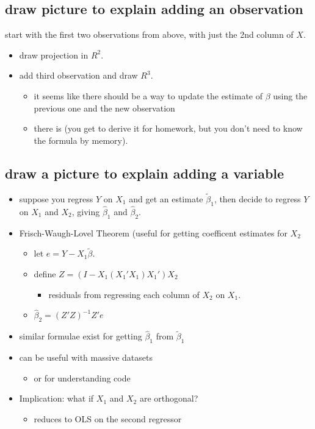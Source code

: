 \subsection{draw picture to explain adding an observation}
\label{sec-2-2}

     start with the first two observations from above, with just the 2nd
     column of $X$.
\begin{itemize}
\item draw projection in $R^2$.
\item add third observation and draw $R^3$.
\begin{itemize}
\item it seems like there should be a way to update the estimate of
         $\beta$ using the previous one and the new observation
\item there is (you get to derive it for homework, but you don't need
         to know the formula by memory).
\end{itemize}
\end{itemize}
\subsection{draw a picture to explain adding a variable}
\label{sec-2-3}

\begin{itemize}
\item suppose you regress $Y$ on $X_1$ and get an estimate
      $\tilde\beta_1$, then decide to regress $Y$ on $X_1$ and $X_2$,
      giving $\hat\beta_1$ and $\hat\beta_2$.
\item Frisch-Waugh-Lovel Theorem (useful for getting coefficent
      estimates for $X_2$
\begin{itemize}
\item let $e = Y - X_1\tilde \beta$.
\item define $Z = (I - X_1(X_1'X_1)X_1')X_2$
\begin{itemize}
\item residuals from regressing each column of $X_2$ on $X_1$.
\end{itemize}
\item $\hat\beta_2 = (Z'Z)^{-1}Z'e$
\end{itemize}
\item similar formulae exist for getting $\hat\beta_1$ from $\tilde
      \beta_1$
\item can be useful with massive datasets
\begin{itemize}
\item or for understanding code
\end{itemize}
\item Implication: what if $X_1$ and $X_2$ are orthogonal?
\begin{itemize}
\item reduces to OLS on the second regressor
\end{itemize}
\end{itemize}
